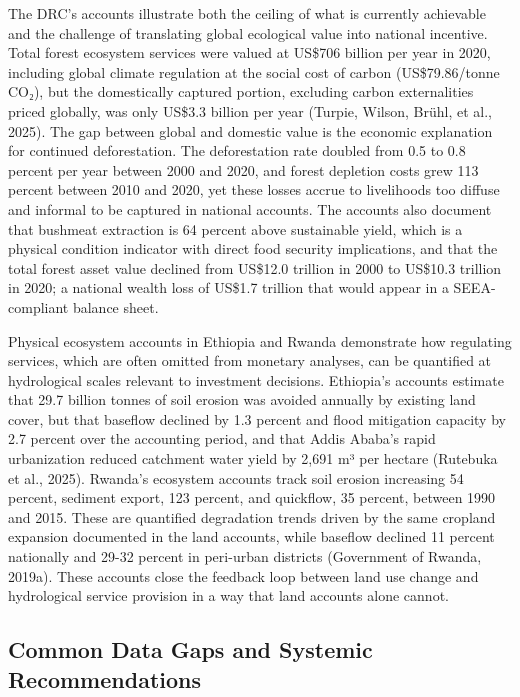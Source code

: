 \documentclass[
  letterpaper,
  DIV=11,
  numbers=noendperiod]{scrartcl}
\begin{document}
The DRC's accounts illustrate both the ceiling of what is currently
achievable and the challenge of translating global ecological value into
national incentive. Total forest ecosystem services were valued at
US\$706 billion per year in 2020, including global climate regulation at
the social cost of carbon (US\$79.86/tonne CO₂), but the domestically
captured portion, excluding carbon externalities priced globally, was
only US\$3.3 billion per year (Turpie, Wilson, Brühl, et al., 2025). The
gap between global and domestic value is the economic explanation for
continued deforestation. The deforestation rate doubled from 0.5 to 0.8
percent per year between 2000 and 2020, and forest depletion costs grew
113 percent between 2010 and 2020, yet these losses accrue to
livelihoods too diffuse and informal to be captured in national
accounts. The accounts also document that bushmeat extraction is 64
percent above sustainable yield, which is a physical condition indicator
with direct food security implications, and that the total forest asset
value declined from US\$12.0 trillion in 2000 to US\$10.3 trillion in
2020; a national wealth loss of US\$1.7 trillion that would appear in a
SEEA-compliant balance sheet.

Physical ecosystem accounts in Ethiopia and Rwanda demonstrate how
regulating services, which are often omitted from monetary analyses, can
be quantified at hydrological scales relevant to investment decisions.
Ethiopia's accounts estimate that 29.7 billion tonnes of soil erosion
was avoided annually by existing land cover, but that baseflow declined
by 1.3 percent and flood mitigation capacity by 2.7 percent over the
accounting period, and that Addis Ababa's rapid urbanization reduced
catchment water yield by 2,691 m³ per hectare (Rutebuka et al., 2025).
Rwanda's ecosystem accounts track soil erosion increasing 54 percent,
sediment export, 123 percent, and quickflow, 35 percent, between 1990
and 2015. These are quantified degradation trends driven by the same
cropland expansion documented in the land accounts, while baseflow
declined 11 percent nationally and 29-32 percent in peri-urban districts
(Government of Rwanda, 2019a). These accounts close the feedback loop
between land use change and hydrological service provision in a way that
land accounts alone cannot.

\subsection{Common Data Gaps and Systemic
Recommendations}\label{common-data-gaps-and-systemic-recommendations}
\end{document}
